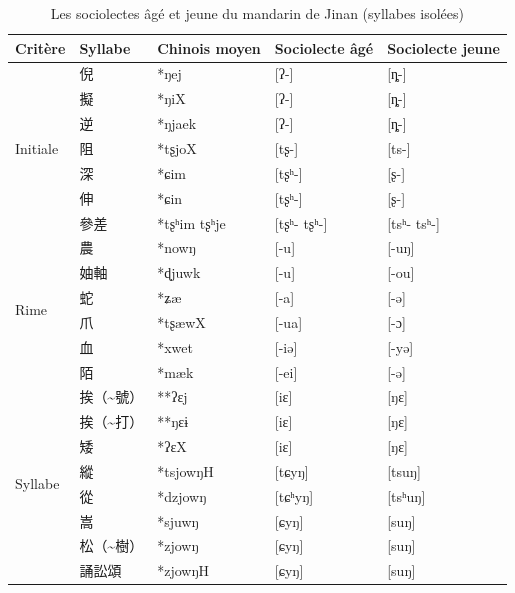 \documentclass{scrbook}
\newcounter{c}[subsubsection]
\newcommand{\bolang}{\textasciitilde}
\newcommand{\diflaoxin}{sociolectes âgé et jeune\xspace}
\newcommand{\iso}{syllabes isolées\xspace}
\begin{document}
\begin{sloppypar}
\begin{table}[htbp]
  \centering
    \begin{tabular}{lllp{7.765em}p{7.765em}}
    \toprule
    Critère & Syllabe & Chinois moyen  & \multicolumn{1}{l}{Sociolecte âgé} & \multicolumn{1}{l}{Sociolecte jeune} \\
    \midrule
    \multirow{7}[2]{*}{Initiale} & \multicolumn{1}{p{7.765em}}{倪} & *ŋej  & [ʔ-]  & [ȵ-] \\
          & \multicolumn{1}{p{7.765em}}{擬} & *ŋiX  & [ʔ-]  & [ȵ-] \\
          & \multicolumn{1}{p{7.765em}}{逆} & *ŋjaek & [ʔ-]  & [ȵ-] \\
          & \multicolumn{1}{p{7.765em}}{阻} & *tʂjoX & [tʂ-] & [ts-] \\
          & \multicolumn{1}{p{7.765em}}{深} & *ɕim  & [tʂʰ-] & [ʂ-] \\
          & \multicolumn{1}{p{7.765em}}{伸} & *ɕin  & [tʂʰ-] & [ʂ-] \\
          & \multicolumn{1}{p{7.765em}}{參差} & *tʂʰim tʂʰje & [tʂʰ- tʂʰ-] & [tsʰ- tsʰ-] \\
    \midrule
    \multirow{6}[2]{*}{Rime} & \multicolumn{1}{p{7.765em}}{農} & *nowŋ & [-u]  & [-uŋ] \\
          & \multicolumn{1}{p{7.765em}}{妯軸} & *ɖjuwk & [-u]  & [-ou] \\
          & \multicolumn{1}{p{7.765em}}{蛇} & *ʑæ   & [-a]  & [-ə] \\
          & \multicolumn{1}{p{7.765em}}{爪} & *tʂæwX & [-ua] & [-ɔ] \\
          & \multicolumn{1}{p{7.765em}}{血} & *xwet & [-iə] & [-yə] \\
          & \multicolumn{1}{p{7.765em}}{陌} & *mæk  & [-ei] & [-ə] \\
    \midrule
    \multirow{8}[2]{*}{Syllabe} & \multicolumn{1}{p{7.765em}}{挨（\bolang 號）} & **ʔɛj & [iɛ]  & [ŋɛ] \\
          & \multicolumn{1}{p{7.765em}}{挨（\bolang 打）} & **ŋɛɨ & [iɛ]  & [ŋɛ] \\
          & \multicolumn{1}{p{7.765em}}{矮} & *ʔɛX  & [iɛ]  & [ŋɛ] \\
          & \multicolumn{1}{p{7.765em}}{縱} & *tsjowŋH & [tɕyŋ] & [tsuŋ] \\
          & \multicolumn{1}{p{7.765em}}{從} & *dzjowŋ & [tɕʰyŋ] & [tsʰuŋ] \\
          & \multicolumn{1}{p{7.765em}}{嵩} & *sjuwŋ & [ɕyŋ] & [suŋ] \\
          & 松（\bolang 樹） & *zjowŋ & [ɕyŋ] & [suŋ] \\
          & 誦訟頌   & *zjowŋH & [ɕyŋ] & [suŋ] \\
    \bottomrule
    \end{tabular}%
  \caption{Les \diflaoxin du mandarin de Jinan (\iso)}
  \label{tab:Jinan2iso}%
\end{table}%


\end{sloppypar}
\end{document}
